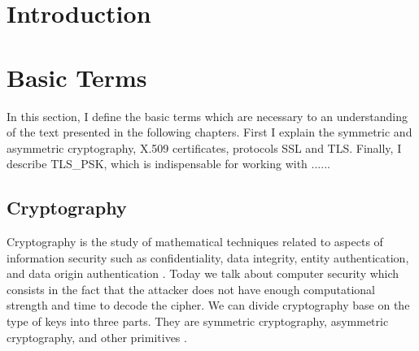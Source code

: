 \documentclass[
  digital, %
  notable,   %
  lof,     %
  lot,     %
]{fithesis3}
\begin{document}
\chapter{Introduction}


\chapter{Basic Terms}
In this section, I define the basic terms which are necessary to an understanding of the text 
presented in the following chapters. First I explain the symmetric and asymmetric 
cryptography, X.509 certificates, protocols SSL and TLS. Finally, I describe TLS\_PSK, which 
is indispensable for working with ......

\section{Cryptography}
Cryptography is the study of mathematical techniques related to aspects of information
security such as confidentiality, data integrity, entity authentication, and data origin
authentication \cite{menezes1996handbook}. %
Today we talk about computer security which consists in the fact that the attacker does not 
have enough computational strength and time to decode the cipher. 
We can divide cryptography base on the type of keys into three parts. They are symmetric 
cryptography, asymmetric cryptography, and other primitives %
\cite{menezes1996handbook}.

\end{document}
